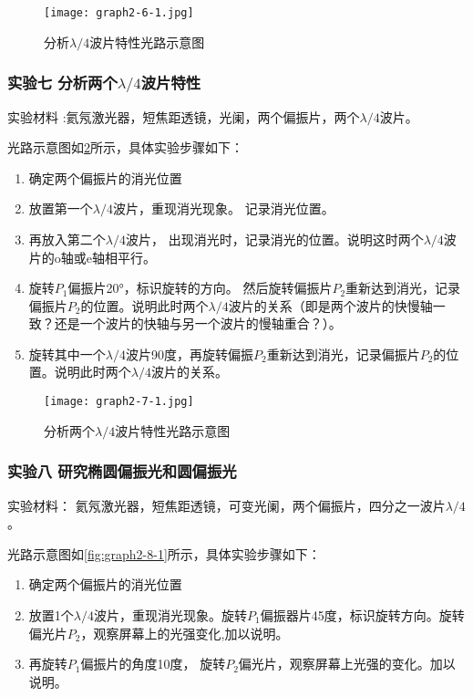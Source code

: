 \documentclass[dvipsnames, svgnames,a4paper,11pt]{article}
\begin{document}
	\begin{figure}[htbp]
		\centering
		\texttt{[image: graph2-6-1.jpg]}
		\caption{分析$\lambda/4$波片特性光路示意图}
		\label{fig:graph2-6-1}
	\end{figure}


	\subsubsection{实验七 \quad 分析两个$\lambda/4$波片特性}

	实验材料 :氦氖激光器，短焦距透镜，光阑，两个偏振片，两个$\lambda/4$波片。

	光路示意图如\cref{fig:graph2-7-1}所示，具体实验步骤如下：
	\begin{enumerate}
		\item 确定两个偏振片的消光位置
		\item 放置第一个$\lambda/4$波片，重现消光现象。 记录消光位置。
		\item 再放入第二个$\lambda/4$波片， 出现消光时，记录消光的位置。说明这时两个$\lambda/4$波片的o轴或e轴相平行。
		\item 旋转$P_1$偏振片20°，标识旋转的方向。 然后旋转偏振片$P_2$重新达到消光，记录偏振片$P_2$的位置。说明此时两个$\lambda/4$波片的关系（即是两个波片的快慢轴一致？还是一个波片的快轴与另一个波片的慢轴重合？）。
		\item 旋转其中一个$\lambda/4$波片90度，再旋转偏振$P_2$重新达到消光，记录偏振片$P_2$的位置。说明此时两个$\lambda/4$波片的关系。
	\end{enumerate}


	\begin{figure}[htbp]
		\centering
		\texttt{[image: graph2-7-1.jpg]}
		\caption{分析两个$\lambda/4$波片特性光路示意图}
		\label{fig:graph2-7-1}
	\end{figure}


	\subsubsection{实验八 \quad 研究椭圆偏振光和圆偏振光}

	实验材料： 氦氖激光器，短焦距透镜，可变光阑，两个偏振片，四分之一波片$\lambda/4$。

	光路示意图如\cref{fig:graph2-8-1}所示，具体实验步骤如下：
	\begin{enumerate}
		\item 确定两个偏振片的消光位置
		\item 放置1个$\lambda/4$波片，重现消光现象。旋转$P_1$偏振器片45度，标识旋转方向。旋转偏光片$P_2$，观察屏幕上的光强变化,加以说明。
		\item 再旋转$P_1$偏振片的角度10度， 旋转$P_2$偏光片，观察屏幕上光强的变化。加以说明。

	\end{enumerate}
	
\end{document}
